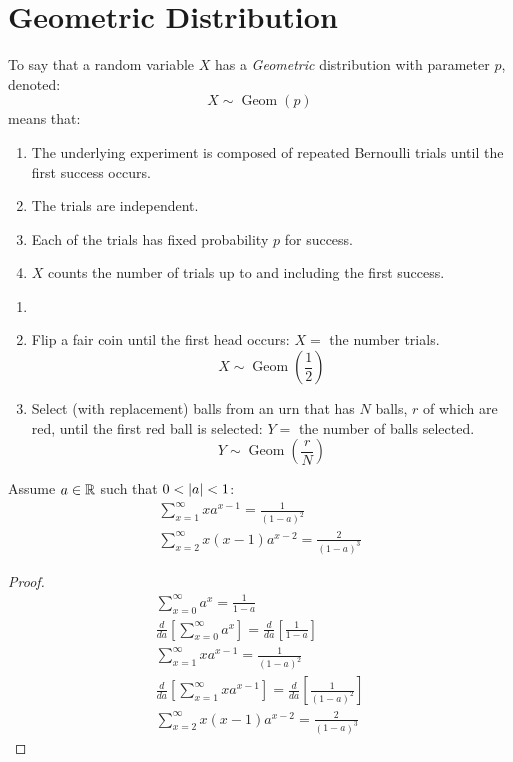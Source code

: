\documentclass[letterpaper,12pt,fleqn]{article}
\DeclareMathOperator{\geom}{Geom}
\begin{document}
\section*{Geometric Distribution}

\begin{definition}
  To say that a random variable \(X\) has a \emph{Geometric} distribution with parameter \(p\), denoted:
  \[X\sim\geom(p)\]
  means that:
  \begin{enumerate}
  \item The underlying experiment is composed of repeated Bernoulli trials until the first success occurs.
  \item The trials are independent.
  \item Each of the trials has fixed probability \(p\) for success.
  \item \(X\) counts the number of trials up to and including the first success.
  \end{enumerate}
\end{definition}

\begin{examples}
  \begin{enumerate}
  \item[]
  \item Flip a fair coin until the first head occurs: \(X=\) the number trials.
    \[X\sim\geom\left(\frac{1}{2}\right)\]
  \item Select (with replacement) balls from an urn that has \(N\) balls, \(r\) of which are red, until the first red ball
    is selected: \(Y=\) the number of balls selected.
    \[Y\sim\geom\left(\frac{r}{N}\right)\]
  \end{enumerate}
\end{examples}

\begin{lemma}
  Assume \(a\in\mathbb{R}\) such that \(0<\lvert a\rvert<1\):
  \begin{gather*}
    \sum_{x=1}^{\infty}xa^{x-1}=\frac{1}{(1-a)^2} \\
    \sum_{x=2}^{\infty}x(x-1)a^{x-2}=\frac{2}{(1-a)^3}
  \end{gather*}
\end{lemma}

\begin{proof}
  \begin{gather*}
    \sum_{x=0}^{\infty}a^x=\frac{1}{1-a} \\
    \frac{d}{da}\left[\sum_{x=0}^{\infty}a^x\right]=\frac{d}{da}\left[\frac{1}{1-a}\right] \\
    \sum_{x=1}^{\infty}xa^{x-1}=\frac{1}{(1-a)^2} \\
    \frac{d}{da}\left[\sum_{x=1}^{\infty}xa^{x-1}\right]=\frac{d}{da}\left[\frac{1}{(1-a)^2}\right] \\
    \sum_{x=2}^{\infty}x(x-1)a^{x-2}=\frac{2}{(1-a)^3}
  \end{gather*}
\end{proof}
\end{document}
